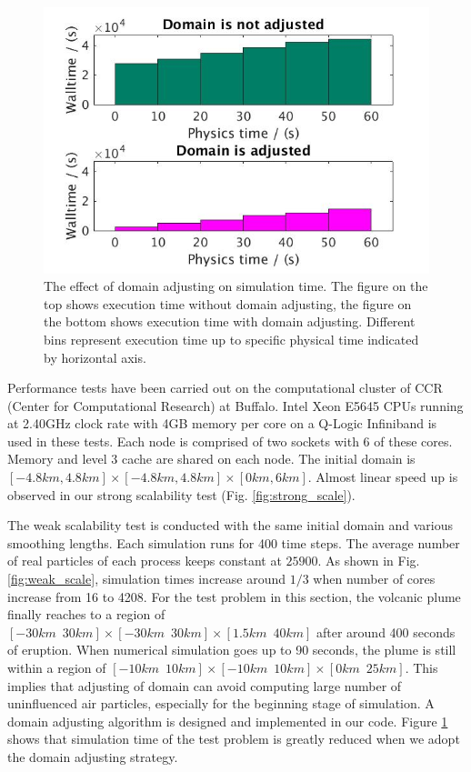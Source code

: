 \documentclass[journal abbreviation, manuscript]{copernicus}
\begin{document}
\begin{figure}[!t]
\centering
\includegraphics[scale=0.35]{adj_vs_no}
\caption{The effect of domain adjusting on simulation time. The figure on the top shows execution time without domain adjusting, the figure on the bottom shows execution time with domain adjusting. Different bins represent execution time up to specific physical time indicated by horizontal axis.}
\label{fig:adj_vs_no}
\end{figure}

Performance tests have been carried out on the computational cluster of CCR (Center for Computational Research) at Buffalo. Intel Xeon E5645 CPUs running at 2.40GHz clock rate with 4GB memory per core on a Q-Logic Infiniband is used in these tests. Each node is comprised of two sockets with 6 of these cores. Memory and level 3 cache are shared on each node. The initial domain is $[-4.8km,4.8km] \times [-4.8km,4.8km] \times [0km, 6km]$. Almost linear speed up is observed in our strong scalability test (Fig. \ref{fig:strong_scale}).

The weak scalability test is conducted with the same initial domain and various smoothing lengths. Each simulation runs for 400 time steps. The average number of real particles of each process keeps constant at $25900$. As shown in Fig. \ref{fig:weak_scale}, simulation times increase around $1/3$ when number of cores increase from 16 to 4208. For the test problem in this section, the volcanic plume finally reaches to a region of $[-30km \,\,\, 30km] \times [-30km\,\,\,30km] \times [1.5km\,\,\,40km]$ after around 400 seconds of eruption. When numerical simulation goes up to 90 seconds, the plume is still within a region of $[-10km\,\,\,10km] \times [-10km\,\,\,10km] \times [0km\,\,\,25km]$. This implies that adjusting of domain can avoid computing large number of uninfluenced air particles, especially for the beginning stage of simulation. A domain adjusting algorithm is designed and implemented in our code. Figure \ref{fig:adj_vs_no} shows that simulation time of the test problem is greatly reduced when we adopt the domain adjusting strategy.
\end{document}
